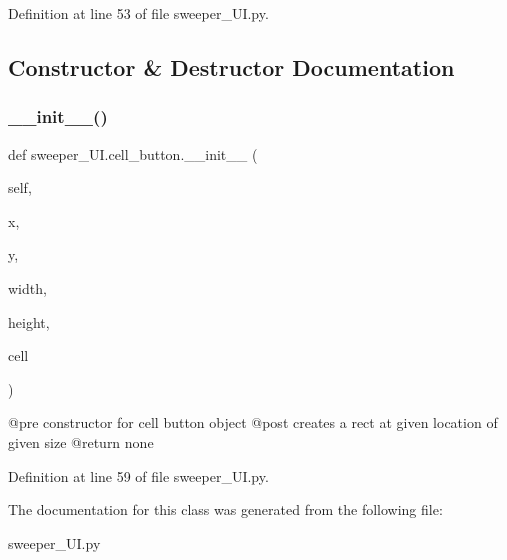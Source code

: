 Definition at line 53 of file sweeper\+\_\+\+U\+I.\+py.



\subsection{Constructor \& Destructor Documentation}
\mbox{\label{classsweeper___u_i_1_1cell__button_a331ff79c7f93f68d677c7b6aaafbc23a}} 
\subsubsection{\texorpdfstring{\+\_\+\+\_\+init\+\_\+\+\_\+()}{\_\_init\_\_()}}
{\footnotesize\ttfamily def sweeper\+\_\+\+U\+I.\+cell\+\_\+button.\+\_\+\+\_\+init\+\_\+\+\_\+ (\begin{DoxyParamCaption}\item[{}]{self,  }\item[{}]{x,  }\item[{}]{y,  }\item[{}]{width,  }\item[{}]{height,  }\item[{}]{cell }\end{DoxyParamCaption})}

\begin{DoxyVerb}@pre constructor for cell button object
@post creates a rect at given location of given size
@return none
\end{DoxyVerb}
 

Definition at line 59 of file sweeper\+\_\+\+U\+I.\+py.



The documentation for this class was generated from the following file\+:\begin{DoxyCompactItemize}
\item 
sweeper\+\_\+\+U\+I.\+py\end{DoxyCompactItemize}
